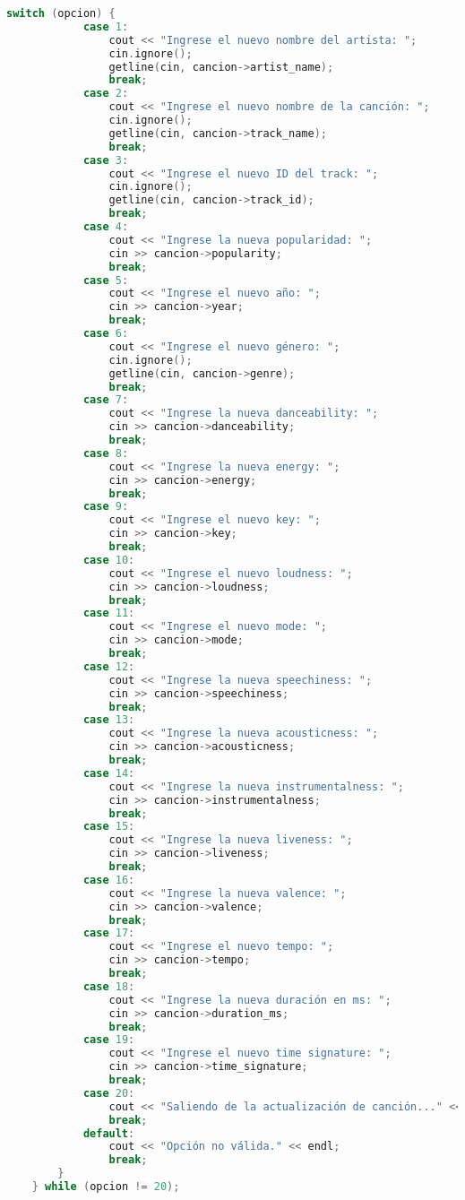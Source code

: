 \documentclass[corference]{IEEEtran}
\begin{document}
\begin{flushleft}
\begin{sloppypar}
\begin{lstlisting}[language=C++, style=mystyle, caption={Cabecera de la Clase Menú}]
        switch (opcion) {
            case 1:
                cout << "Ingrese el nuevo nombre del artista: ";
                cin.ignore();
                getline(cin, cancion->artist_name);
                break;
            case 2:
                cout << "Ingrese el nuevo nombre de la canción: ";
                cin.ignore();
                getline(cin, cancion->track_name);
                break;
            case 3:
                cout << "Ingrese el nuevo ID del track: ";
                cin.ignore();
                getline(cin, cancion->track_id);
                break;
            case 4:
                cout << "Ingrese la nueva popularidad: ";
                cin >> cancion->popularity;
                break;
            case 5:
                cout << "Ingrese el nuevo año: ";
                cin >> cancion->year;
                break;
            case 6:
                cout << "Ingrese el nuevo género: ";
                cin.ignore();
                getline(cin, cancion->genre);
                break;
            case 7:
                cout << "Ingrese la nueva danceability: ";
                cin >> cancion->danceability;
                break;
            case 8:
                cout << "Ingrese la nueva energy: ";
                cin >> cancion->energy;
                break;
            case 9:
                cout << "Ingrese el nuevo key: ";
                cin >> cancion->key;
                break;
            case 10:
                cout << "Ingrese el nuevo loudness: ";
                cin >> cancion->loudness;
                break;
            case 11:
                cout << "Ingrese el nuevo mode: ";
                cin >> cancion->mode;
                break;
            case 12:
                cout << "Ingrese la nueva speechiness: ";
                cin >> cancion->speechiness;
                break;
            case 13:
                cout << "Ingrese la nueva acousticness: ";
                cin >> cancion->acousticness;
                break;
            case 14:
                cout << "Ingrese la nueva instrumentalness: ";
                cin >> cancion->instrumentalness;
                break;
            case 15:
                cout << "Ingrese la nueva liveness: ";
                cin >> cancion->liveness;
                break;
            case 16:
                cout << "Ingrese la nueva valence: ";
                cin >> cancion->valence;
                break;
            case 17:
                cout << "Ingrese el nuevo tempo: ";
                cin >> cancion->tempo;
                break;
            case 18:
                cout << "Ingrese la nueva duración en ms: ";
                cin >> cancion->duration_ms;
                break;
            case 19:
                cout << "Ingrese el nuevo time signature: ";
                cin >> cancion->time_signature;
                break;
            case 20:
                cout << "Saliendo de la actualización de canción..." << endl;
                break;
            default:
                cout << "Opción no válida." << endl;
                break;
        }
    } while (opcion != 20);


\end{lstlisting}
\end{sloppypar}
\end{flushleft}
\end{document}
